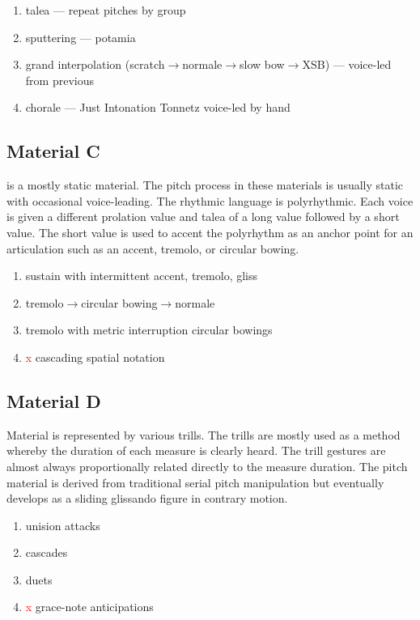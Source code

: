 \begin{enumerate}
\item talea — repeat pitches by group
\item sputtering — potamia
\item grand interpolation (scratch$\rightarrow$normale$\rightarrow$slow bow$\rightarrow$\ac{XSB}) — voice-led from previous
\item chorale — Just Intonation Tonnetz voice-led by hand
\end{enumerate}

\subsection{Material C}\label{material-C-summary}

 is a mostly static material. The pitch process in these materials is usually static with occasional voice-leading. The rhythmic language is polyrhythmic. Each voice is given a different prolation value and talea of a long value followed by a short value. The short value is used to accent the polyrhythm as an anchor point for an articulation such as an accent, tremolo, or circular bowing.

\begin{enumerate}
\item sustain with intermittent accent, tremolo, gliss
\item tremolo$\rightarrow$circular bowing$\rightarrow$normale
\item tremolo with  metric interruption circular bowings
\item \textcolor{red}{x} cascading spatial notation
\end{enumerate}

\subsection{Material D}

Material  is represented by various trills. The trills are mostly used as a method whereby the duration of each measure is clearly heard. The trill gestures are almost always proportionally related directly to the measure duration. The pitch material is derived from traditional serial pitch manipulation but eventually develops as a sliding glissando figure in contrary motion.

\begin{enumerate}
\item unision attacks
\item cascades
\item duets
\item \textcolor{red}{x} grace-note anticipations
\end{enumerate}


